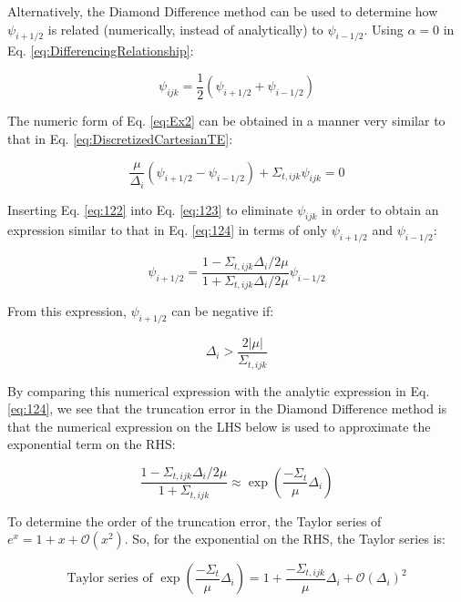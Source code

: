 \documentclass[10pt]{article}
\begin{document}
\begin{flushleft}
\begin{tcolorbox}[breakable]
Alternatively, the Diamond Difference method can be used to determine how \(\psi_{i+1/2}\) is related (numerically, instead of analytically) to \(\psi_{i-1/2}\). Using \(\alpha=0\) in Eq. \eqref{eq:DifferencingRelationship}:

\begin{equation}
\label{eq:122}
\psi_{ijk}=\frac{1}{2}\left(\psi_{i+1/2}+\psi_{i-1/2}\right)
\end{equation}

The numeric form of Eq. \eqref{eq:Ex2} can be obtained in a manner very similar to that in Eq. \eqref{eq:DiscretizedCartesianTE}:

\begin{equation}
\label{eq:123}
\frac{\mu}{\Delta_i}(\psi_{i+1/2}-\psi_{i-1/2})+\Sigma_{t,ijk}\psi_{ijk}=0
\end{equation}

Inserting Eq. \eqref{eq:122} into Eq. \eqref{eq:123} to eliminate \(\psi_{ijk}\) in order to obtain an expression similar to that in Eq. \eqref{eq:124} in terms of only \(\psi_{i+1/2}\) and \(\psi_{i-1/2}\):

\begin{equation}
\psi_{i+1/2}=\frac{1-\Sigma_{t,ijk}\Delta_i/2\mu}{1+\Sigma_{t,ijk}\Delta_i/2\mu}\psi_{i-1/2}
\end{equation}

From this expression, \(\psi_{i+1/2}\) can be negative if:

\begin{equation}
\Delta_i>\frac{2|\mu|}{\Sigma_{t,ijk}}
\end{equation}

By comparing this numerical expression with the analytic expression in Eq. \eqref{eq:124}, we see that the truncation error in the Diamond Difference method is that the numerical expression on the LHS below is used to approximate the exponential term on the RHS:

\begin{equation}
\label{eq:125}
\frac{1-\Sigma_{t,ijk}\Delta_i/2\mu}{1+\Sigma_{t,ijk}}\approx\exp{\left(\frac{-\Sigma_t}{\mu}\Delta_i\right)}
\end{equation}

To determine the order of the truncation error, the Taylor series of \(e^x=1+x+\mathscr{O}(x^2)\). So, for the exponential on the RHS, the Taylor series is:

\begin{equation}
\text{Taylor series of } \exp{\left(\frac{-\Sigma_t}{\mu}\Delta_i\right)}=1+\frac{-\Sigma_{t,ijk}}{\mu}\Delta_i+\mathscr{O}(\Delta_i)^2
\end{equation}


\end{tcolorbox}
\end{flushleft}
\end{document}
